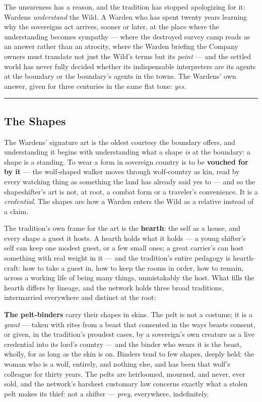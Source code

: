 The unsureness has a reason, and the tradition has stopped apologizing for it: Wardens \textit{understand} the Wild. A Warden who has spent twenty years learning why the sovereigns act arrives, sooner or later, at the place where the understanding becomes sympathy --- where the destroyed survey camp reads as an answer rather than an atrocity, where the Warden briefing the Company owners must translate not just the Wild's terms but its \textit{point} --- and the settled world has never fully decided whether its indispensable interpreters are its agents at the boundary or the boundary's agents in the towns. The Wardens' own answer, given for three centuries in the same flat tone: \textit{yes.}

\medskip\hrule\medskip

\subsection{The Shapes}

The Wardens' signature art is the oldest courtesy the boundary offers, and understanding it begins with understanding what a shape \textit{is} at the boundary: a shape is a standing. To wear a form in sovereign country is to be \textbf{vouched for by it} --- the wolf-shaped walker moves through wolf-country as kin, read by every watching thing as something the land has already said yes to --- and so the shapeshifter's art is not, at root, a combat form or a traveler's convenience. It is a \textit{credential}. The shapes are how a Warden enters the Wild as a relative instead of a claim.

The tradition's own frame for the art is the \textbf{hearth}: the self as a house, and every shape a guest it hosts. A hearth holds what it holds --- a young shifter's self can keep one modest guest, or a few small ones; a great carrier's can host something with real weight in it --- and the tradition's entire pedagogy is hearth-craft: how to take a guest in, how to keep the rooms in order, how to remain, across a working life of being many things, unmistakably the host. What fills the hearth differs by lineage, and the network holds three broad traditions, intermarried everywhere and distinct at the root:

\textbf{The pelt-binders} carry their shapes in skins. The pelt is not a costume; it is a \textit{grant} --- taken with rites from a beast that consented in the ways beasts consent, or given, in the tradition's proudest cases, by a sovereign's own creature as a live credential into its lord's country --- and the binder who wears it is the beast, wholly, for as long as the skin is on. Binders tend to few shapes, deeply held: the woman who is a wolf, entirely, and nothing else, and has been that wolf's colleague for thirty years. The pelts are heirloomed, mourned, and never, ever sold, and the network's harshest customary law concerns exactly what a stolen pelt makes its thief: not a shifter --- \textit{prey}, everywhere, indefinitely.

